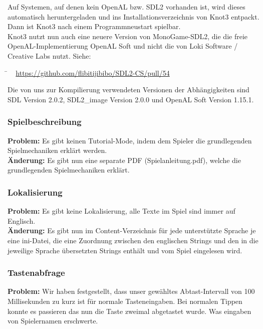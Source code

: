 Auf Systemen, auf denen kein OpenAL bzw. SDL2 vorhanden ist, wird dieses automatisch heruntergeladen und ins Installationsverzeichnis von Knot3 entpackt.
Dann ist Knot3 nach einem Programmneustart spielbar.\\

Knot3 nutzt nun auch eine neuere Version von MonoGame-SDL2, die die freie OpenAL-Implementierung OpenAL Soft und nicht die von Loki Software / Creative Labs nutzt. Siehe:  	
  	\begin{tabbing}
  			\= ~ \href {https://github.com/flibitijibibo/SDL2-CS/pull/54}
  					   {https://github.com/flibitijibibo/SDL2-CS/pull/54}\\
  					   
  	\end{tabbing} 

Die von uns zur Kompilierung verwendeten Versionen der Abhängigkeiten sind SDL Version 2.0.2, SDL2\_image Version 2.0.0 und OpenAL Soft Version 1.15.1.


\subsubsection*{Spielbeschreibung}

\textbf{Problem:}
Es gibt keinen Tutorial-Mode, indem dem Spieler die grundlegenden Spielmechaniken erklärt werden.\\

\textbf{Änderung:} Es gibt nun eine separate PDF (\glqq Spielanleitung.pdf\grqq), welche die grundlegenden Spielmechaniken erklärt.\\



\subsubsection*{Lokalisierung}

\textbf{Problem:}
Es gibt keine Lokalisierung, alle Texte im Spiel sind immer auf Englisch.\\

\textbf{Änderung:} Es gibt nun im Content-Verzeichnis für jede unterstützte Sprache je eine ini-Datei, die eine Zuordnung zwischen den englischen Strings und den in die jeweilige Sprache übersetzten Strings enthält und vom Spiel eingelesen wird.\\



\subsubsection*{Tastenabfrage}
\textbf{Problem:}
Wir haben festgestellt, dass unser gewähltes Abtast-Intervall von 100 Millisekunden zu kurz ist für normale Tasteneingaben. Bei normalen Tippen konnte es passieren das nun die Taste zweimal abgetastet wurde. Was eingaben von Spielernamen erschwerte.\\

